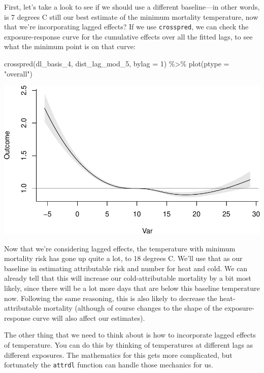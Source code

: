 \documentclass[
]{book}
\newenvironment{Shaded}{\begin{snugshade}}{\end{snugshade}}
\newcommand{\AttributeTok}[1]{\textcolor[rgb]{0.77,0.63,0.00}{#1}}
\newcommand{\DecValTok}[1]{\textcolor[rgb]{0.00,0.00,0.81}{#1}}
\newcommand{\FunctionTok}[1]{\textcolor[rgb]{0.00,0.00,0.00}{#1}}
\newcommand{\NormalTok}[1]{#1}
\newcommand{\SpecialCharTok}[1]{\textcolor[rgb]{0.00,0.00,0.00}{#1}}
\newcommand{\StringTok}[1]{\textcolor[rgb]{0.31,0.60,0.02}{#1}}
\begin{document}
First, let's take a look to see if we should use a different baseline---in other words, is 7 degrees C still our best estimate of the minimum mortality temperature, now that we're incorporating lagged effects? If we use \texttt{crosspred}, we can check the exposure-response curve for the cumulative effects over all the fitted lags, to see what the minimum point is on that curve:

\begin{Shaded}
\begin{Highlighting}[]
\FunctionTok{crosspred}\NormalTok{(dl\_basis\_4, dist\_lag\_mod\_5, }\AttributeTok{bylag =} \DecValTok{1}\NormalTok{) }\SpecialCharTok{\%\textgreater{}\%} 
  \FunctionTok{plot}\NormalTok{(}\AttributeTok{ptype =} \StringTok{"overall"}\NormalTok{)}
\end{Highlighting}
\end{Shaded}

\includegraphics{adv_epi_analysis_files/figure-latex/unnamed-chunk-161-1.pdf}

Now that we're considering lagged effects, the temperature with minimum mortality risk has gone up quite a lot, to 18 degrees C. We'll use that as our baseline in estimating attributable risk and number for heat and cold. We can already tell that this will increase our cold-attributable mortality by a bit most likely, since there will be a lot more days that are below this baseline temperature now. Following the same reasoning, this is also likely to decrease the heat-attributable mortality (although of course changes to the shape of the exposure-response curve will also affect our estimates).

The other thing that we need to think about is how to incorporate lagged effects of temperature. You can do this by thinking of temperatures at different lags as different exposures. The mathematics for this gets more complicated, but fortunately the \texttt{attrdl} function can handle those mechanics for us.
\end{document}
